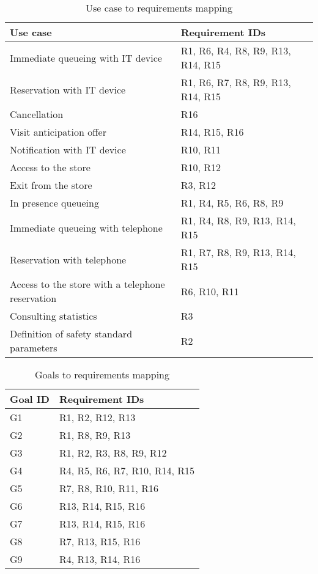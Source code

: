 \documentclass[../../main.tex]{subfiles}
\begin{document}
    {
    \begin{table}[H]
      \centering
      \begin{tabular}{|l|l|}
        \hline
        \textbf{Use case} & \textbf{Requirement IDs}\\ \hline\hline
        Immediate queueing with IT device & R1, R6, R4, R8, R9, R13, R14, R15 \\
        Reservation with IT device & R1, R6, R7, R8, R9, R13, R14, R15 \\
        Cancellation & R16 \\
        Visit anticipation offer & R14, R15, R16 \\
        Notification with IT device & R10, R11 \\
        Access to the store & R10, R12 \\
        Exit from the store & R3, R12 \\
        In presence queueing & R1, R4, R5, R6, R8, R9 \\
        Immediate queueing with telephone & R1, R4, R8, R9, R13, R14, R15 \\
        Reservation with telephone & R1, R7, R8, R9, R13, R14, R15\\
        Access to the store with a telephone reservation &  R6, R10, R11\\
        Consulting statistics & R3\\
        Definition of safety standard parameters & R2\\
        \hline
      \end{tabular}
      \caption{Use case to requirements mapping}
      \end{table}
    }
    
    {
    \begin{table}[H]
      \centering
      \begin{tabular}{|l|l|}
        \hline
        \textbf{Goal ID} & \textbf{Requirement IDs}\\ \hline\hline
        G1 & R1, R2, R12, R13 \\
        G2 & R1, R8, R9, R13 \\
        G3 & R1, R2, R3, R8, R9, R12\\
        G4 & R4, R5, R6, R7, R10, R14, R15\\
        G5 & R7, R8, R10, R11, R16\\
        G6 & R13, R14, R15, R16\\
        G7 & R13, R14, R15, R16\\
        G8 & R7, R13, R15, R16\\
        G9 & R4, R13, R14, R16\\
        \hline
      \end{tabular}
      \caption{Goals to requirements mapping}
      \end{table}
    }
\end{document}
